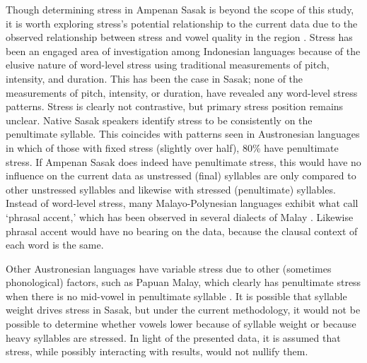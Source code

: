 \documentclass[12pt]{ouparticle}
\begin{document}
Though determining stress in Ampenan Sasak is beyond the scope of this study, it is worth exploring stress's potential relationship to the current data due to the observed relationship between stress and vowel quality in the region \citep{kaland2019}. Stress has been an engaged area of investigation among Indonesian languages because of the elusive nature of word-level stress using traditional measurements of pitch, intensity, and duration. This has been the case in Sasak; none of the measurements of pitch, intensity, or duration, have revealed any word-level stress patterns. Stress is clearly not contrastive, but primary stress position remains unclear. Native Sasak speakers identify stress to be consistently on the penultimate syllable. This coincides with patterns seen in Austronesian languages in which of those with fixed stress (slightly over half), 80\% have penultimate stress. If Ampenan Sasak does indeed have penultimate stress, this would have no influence on the current data as unstressed (final) syllables are only compared to other unstressed syllables and likewise with stressed (penultimate) syllables. Instead of word-level stress, many Malayo-Polynesian languages exhibit what \citet{goedemans2014} call `phrasal accent,' which has been observed in several dialects of Malay \citep{vanzanten1998, vanzanten2004, maskikit2016}. Likewise phrasal accent would have no bearing on the data, because the clausal context of each word is the same. 

Other Austronesian languages have variable stress due to other (sometimes phonological) factors, such as Papuan Malay, which clearly has penultimate stress when there is no mid-vowel in penultimate syllable \citep{kaland2019}. It is possible that syllable weight drives stress in Sasak, but under the current methodology, it would not be possible to determine whether vowels lower because of syllable weight or because heavy syllables are stressed. In light of the presented data, it is assumed that stress, while possibly interacting with results, would not nullify them.



\end{document}
